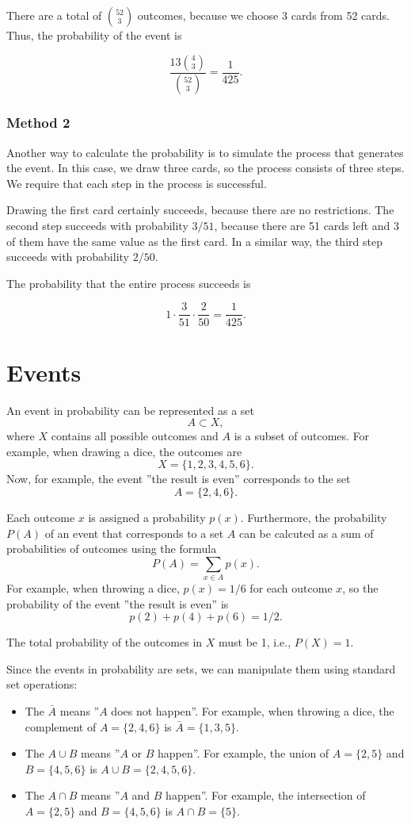 There are a total of ${52 \choose 3}$ outcomes,
because we choose 3 cards from 52 cards.
Thus, the probability of the event is

\[\frac{13 {4 \choose 3}}{{52 \choose 3}} = \frac{1}{425}.\]

\subsubsection*{Method 2}

Another way to calculate the probability is
to simulate the process that generates the event.
In this case, we draw three cards, so the process
consists of three steps.
We require that each step in the process is successful.

Drawing the first card certainly succeeds,
because there are no restrictions.
The second step succeeds with probability $3/51$,
because there are 51 cards left and 3 of them
have the same value as the first card.
In a similar way, the third step succeeds with probability $2/50$.

The probability that the entire process succeeds is

\[1 \cdot \frac{3}{51} \cdot \frac{2}{50} = \frac{1}{425}.\]

\section{Events}

An event in probability can be represented as a set
\[A \subset X,\]
where $X$ contains all possible outcomes
and $A$ is a subset of outcomes.
For example, when drawing a dice, the outcomes are
\[X = \{1,2,3,4,5,6\}.\]
Now, for example, the event ''the result is even''
corresponds to the set
\[A = \{2,4,6\}.\]

Each outcome $x$ is assigned a probability $p(x)$.
Furthermore, the probability $P(A)$ of an event
that corresponds to a set $A$ can be calcuted as a sum
of probabilities of outcomes using the formula
\[P(A) = \sum_{x \in A} p(x).\]
For example, when throwing a dice,
$p(x)=1/6$ for each outcome $x$,
so the probability of the event
''the result is even'' is
\[p(2)+p(4)+p(6)=1/2.\]

The total probability of the outcomes in $X$ must
be 1, i.e., $P(X)=1$.

Since the events in probability are sets,
we can manipulate them using standard set operations:

\begin{itemize}
\item The  $\bar A$ means
''$A$ does not happen''.
For example, when throwing a dice, 
the complement of $A=\{2,4,6\}$ is
$\bar A = \{1,3,5\}$.
\item The  $A \cup B$ means
''$A$ or $B$ happen''.
For example, the union of
$A=\{2,5\}$
and $B=\{4,5,6\}$ is
$A \cup B = \{2,4,5,6\}$.
\item The  $A \cap B$ means
''$A$ and $B$ happen''.
For example, the intersection of
$A=\{2,5\}$ and $B=\{4,5,6\}$ is
$A \cap B = \{5\}$.
\end{itemize}

